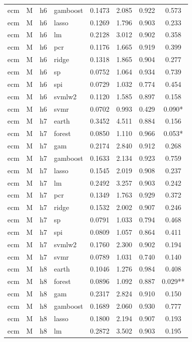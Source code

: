 \begin{ThreePartTable}
\begin{longtable}[t]{llclcccc}
ecm & M & h6 & gamboost & 0.1473 & 2.085 & 0.922 & 0.573\\
ecm & M & h6 & lasso & 0.1269 & 1.796 & 0.903 & 0.233\\
ecm & M & h6 & lm & 0.2128 & 3.012 & 0.902 & 0.358\\
ecm & M & h6 & pcr & 0.1176 & 1.665 & 0.919 & 0.399\\
ecm & M & h6 & ridge & 0.1318 & 1.865 & 0.904 & 0.277\\
ecm & M & h6 & sp & 0.0752 & 1.064 & 0.934 & 0.739\\
ecm & M & h6 & spi & 0.0729 & 1.032 & 0.774 & 0.454\\
ecm & M & h6 & svmlw2 & 0.1120 & 1.585 & 0.897 & 0.158\\
ecm & M & h6 & svmr & 0.0702 & 0.993 & 0.429 & 0.090*\\
\addlinespace
ecm & M & h7 & earth & 0.3452 & 4.511 & 0.884 & 0.156\\
ecm & M & h7 & forest & 0.0850 & 1.110 & 0.966 & 0.053*\\
ecm & M & h7 & gam & 0.2174 & 2.840 & 0.912 & 0.268\\
ecm & M & h7 & gamboost & 0.1633 & 2.134 & 0.923 & 0.759\\
ecm & M & h7 & lasso & 0.1545 & 2.019 & 0.908 & 0.237\\
ecm & M & h7 & lm & 0.2492 & 3.257 & 0.903 & 0.242\\
ecm & M & h7 & pcr & 0.1349 & 1.763 & 0.929 & 0.372\\
ecm & M & h7 & ridge & 0.1532 & 2.002 & 0.907 & 0.246\\
ecm & M & h7 & sp & 0.0791 & 1.033 & 0.794 & 0.468\\
ecm & M & h7 & spi & 0.0809 & 1.057 & 0.864 & 0.411\\
ecm & M & h7 & svmlw2 & 0.1760 & 2.300 & 0.902 & 0.194\\
ecm & M & h7 & svmr & 0.0789 & 1.031 & 0.740 & 0.140\\
\addlinespace
ecm & M & h8 & earth & 0.1046 & 1.276 & 0.984 & 0.408\\
ecm & M & h8 & forest & 0.0896 & 1.092 & 0.887 & 0.029**\\
ecm & M & h8 & gam & 0.2317 & 2.824 & 0.910 & 0.150\\
ecm & M & h8 & gamboost & 0.1689 & 2.060 & 0.930 & 0.777\\
ecm & M & h8 & lasso & 0.1800 & 2.194 & 0.907 & 0.193\\
ecm & M & h8 & lm & 0.2872 & 3.502 & 0.903 & 0.195\\

\end{longtable}
\end{ThreePartTable}
